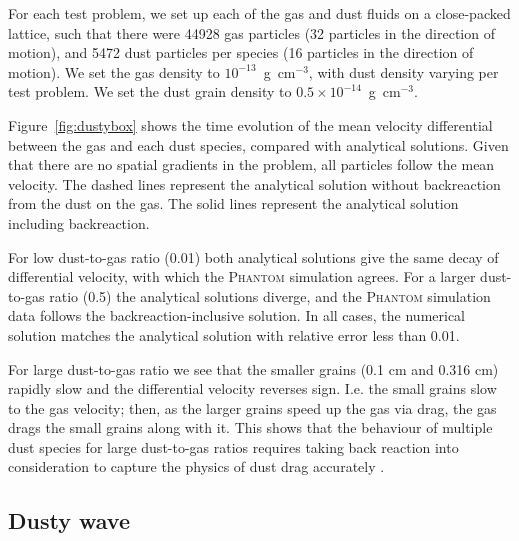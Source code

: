 \documentclass[fleqn,usenatbib]{mnras}
\begin{document}
For each test problem, we set up each of the gas and dust fluids on a
close-packed lattice, such that there were 44928 gas particles (32 particles in
the direction of motion), and 5472 dust particles per species (16 particles in
the direction of motion). We set the gas density to
\(10^{-13}\)~g~cm\({}^{-3}\), with dust density varying per test problem. We set
the dust grain density to \(0.5 \times 10^{-14}\)~g~cm\({}^{-3}\).

Figure~\ref{fig:dustybox} shows the time evolution of the mean velocity
differential between the gas and each dust species, compared with analytical
solutions. Given that there are no spatial gradients in the problem, all
particles follow the mean velocity. The dashed lines represent the analytical
solution without backreaction from the dust on the gas. The solid lines
represent the analytical solution including backreaction.

For low dust-to-gas ratio (0.01) both analytical solutions give the same decay
of differential velocity, with which the \textsc{Phantom} simulation agrees. For
a larger dust-to-gas ratio (0.5) the analytical solutions diverge, and the
\textsc{Phantom} simulation data follows the backreaction-inclusive solution. In
all cases, the numerical solution matches the analytical solution with relative
error less than 0.01.

For large dust-to-gas ratio we see that the smaller grains (0.1 cm and 0.316 cm)
rapidly slow and the differential velocity reverses sign. I.e. the small grains
slow to the gas velocity; then, as the larger grains speed up the gas via drag,
the gas drags the small grains along with it. This shows that the behaviour of
multiple dust species for large dust-to-gas ratios requires taking back reaction
into consideration to capture the physics of dust drag accurately
\citep{Gonzalez2017MNRAS.467.1984G,Dipierro2018MNRAS.479.4187D}.

\subsection{Dusty wave}%
\label{subsec:wave}
\end{document}
